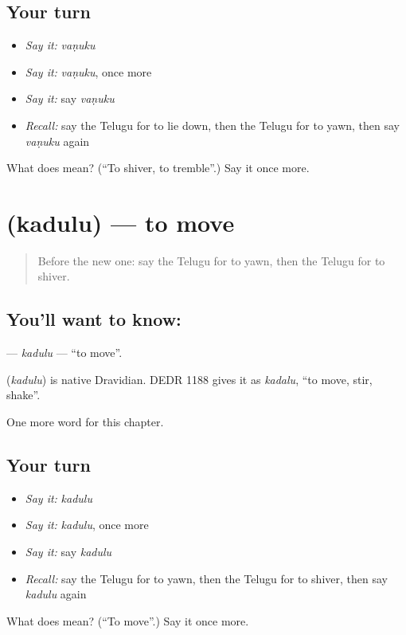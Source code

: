 \subsection*{Your turn}
\begin{itemize}
\raggedright
  \item \emph{Say it:} \emph{vaṇuku}
  \item \emph{Say it:} \emph{vaṇuku}, once more
  \item \emph{Say it:} say \emph{vaṇuku}
  \item \emph{Recall:} say the Telugu for to lie down, then the Telugu for to yawn, then say \emph{vaṇuku} again
\end{itemize}

\begin{tcolorbox}[breakable,colback=teal!4,colframe=teal!35!black,title={Before you move on}]
What does  mean? (\textquotedblleft{}To shiver, to tremble\textquotedblright{}.) Say it once more.
\end{tcolorbox}
\section[\texorpdfstring{\te{కదులు} (kadulu)}{కదులు (kadulu)}]{ (kadulu) — to move}

\label{lesson:TE-C201-kadulu}



\begin{quote}
Before the new one: say the Telugu for to yawn, then the Telugu for to shiver.
\end{quote}

\subsection*{You'll want to know: }
\textbf{} — \emph{kadulu} — \textquotedblleft{}to move\textquotedblright{}.

\begin{cousinweb}
\textbf{} (\emph{kadulu}) is native Dravidian. DEDR 1188 gives it as \emph{kadalu}, \textquotedblleft{}to move, stir, shake\textquotedblright{}.
\end{cousinweb}

\begin{grammarlens}[title={What you've built}]
One more word for this chapter.
\end{grammarlens}

\subsection*{Your turn}
\begin{itemize}
\raggedright
  \item \emph{Say it:} \emph{kadulu}
  \item \emph{Say it:} \emph{kadulu}, once more
  \item \emph{Say it:} say \emph{kadulu}
  \item \emph{Recall:} say the Telugu for to yawn, then the Telugu for to shiver, then say \emph{kadulu} again
\end{itemize}

\begin{tcolorbox}[breakable,colback=teal!4,colframe=teal!35!black,title={Before you move on}]
What does  mean? (\textquotedblleft{}To move\textquotedblright{}.) Say it once more.
\end{tcolorbox}
